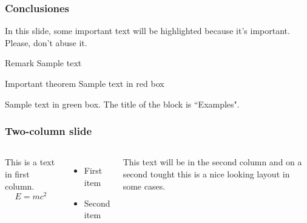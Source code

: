 \documentclass{beamer}
\begin{document}
\begin{frame}
\frametitle{Conclusiones}

In this slide, some important text will be
\alert{highlighted} because it's important.
Please, don't abuse it.

\begin{block}{Remark}
Sample text
\end{block}

\begin{alertblock}{Important theorem}
Sample text in red box
\end{alertblock}

\begin{examples}
Sample text in green box. The title of the block is ``Examples".
\end{examples}
\end{frame}


\begin{frame}
\frametitle{Two-column slide}

\begin{columns}

This is a text in first column.
$$E=mc^2$$
\begin{itemize}
\item First item
\item Second item
\end{itemize}

This text will be in the second column
and on a second tought this is a nice looking
layout in some cases.
\end{columns}
\end{frame}
\end{document}
